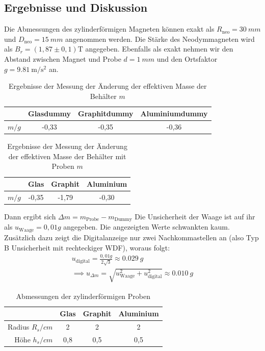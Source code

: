 \documentclass[
	a4paper,
	12pt,
	pagesize,
	ngerman
]{scrartcl}
\begin{document}
	\subsection{Ergebnisse und Diskussion}
	Die Abmessungen des zylinderförmigen Magneten können exakt als $R_\text{neo}= \SI{30}{mm}$ und $D_\text{neo}=\SI{15}{mm}$ angenommen werden. Die Stärke des Neodymmagneten wird als $B_r = (1,87 \pm 0,1 ) \si{\tesla}$ angegeben. Ebenfalls als exakt nehmen wir den Abstand zwischen Magnet und Probe $d= \SI{1}{mm}$ und den Ortsfaktor $g=\SI{9,81}{\meter \per \second \squared}$ an. 
	\newline
	\begin{table}[h]
	\centering
	\begin{tabular}{ r | c | c | c |}
		 & Glasdummy & Graphitdummy & Aluminiumdummy\\ \hline
		$m  \si{/g}$ &-0,33 & -0,35 & -0,36\\ \hline

	\end{tabular}
	\caption{Ergebnisse der Messung der Änderung der effektiven Masse der Behälter $m$}
	\end{table}
\newline 
	\begin{table}[h]
	\centering
	\begin{tabular}{ r | c | c | c |}
		 & Glas & Graphit & Aluminium \\ \hline
		$m  \si{/g}$ & -0,35 &-1,79 & -0,30 \\\hline

	\end{tabular}
	\caption{Ergebnisse der Messung der Änderung der effektiven Masse der Behälter mit Proben $m$}
	\end{table}
	Dann ergibt sich $\Delta m = m_{\text{Probe}} - m_{\text{Dummy}} $ \newline
	Die Unsicherheit der Waage ist auf ihr als $u_\text{Waage}=0,01 \si{g}$ angegeben. Die angezeigten Werte schwankten kaum. Zusätzlich dazu zeigt die Digitalanzeige nur zwei Nachkommastellen an (also Typ B Unsicherheit mit rechteckiger WDF), woraus folgt:  \\
	\begin{gather*}
		u_\text{digital}=\frac{0,01 \si{g}}{2\sqrt{3}} \approx \SI{0,029}{g} \\
		\implies u_{\Delta m}= \sqrt{u_\text{Waage}^2 + u_\text{digital}^2}  \approx \SI{0,010}{g} 
	\end{gather*}
	\begin{table}[h]
	\centering
	\begin{tabular}{ r | c | c | c |}
		& Glas & Graphit & Aluminium \\ \hline
		Radius $R_s \si{/cm}$ & 2 & 2 & 2\\
		Höhe $h_s \si{/cm}$ & 0,8 & 0,5 & 0,5\\\hline

	\end{tabular}
	\caption{Abmessungen der zylinderförmigen Proben}
	\end{table}
\end{document}
